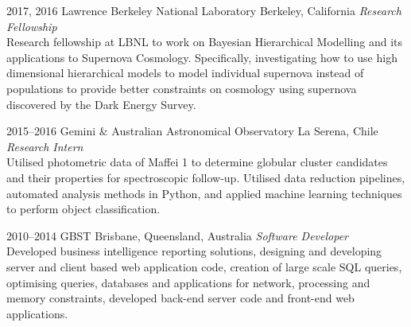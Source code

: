 \documentclass[]{friggeri-cv} %
\begin{document}
\begin{entrylist}

\entry
{2017, 2016}
{Lawrence Berkeley National Laboratory}
{Berkeley, California}
{\emph{Research Fellowship} \\
	Research fellowship at LBNL to work on Bayesian Hierarchical Modelling and its applications to Supernova Cosmology. Specifically, investigating how to use high dimensional hierarchical models to model individual supernova instead of populations to provide better constraints on cosmology using supernova discovered by the Dark Energy Survey.}


\entry
{2015--2016}
{Gemini \& Australian Astronomical Observatory}
{La Serena, Chile}
{\emph{Research Intern} \\
Utilised photometric data of Maffei 1 to determine globular cluster candidates and their properties for spectroscopic follow-up. Utilised data reduction pipelines, automated analysis methods in Python, and applied machine learning techniques to perform object classification.}

\entry
{2010--2014}
{GBST}
{Brisbane, Queensland, Australia}
{\emph{Software Developer} \\
Developed business intelligence reporting solutions, designing and developing server and client based web application code, creation of large scale SQL queries, optimising queries, databases and applications for network, processing and memory constraints, developed back-end server code and front-end web applications.}


\end{entrylist}
\end{document}
